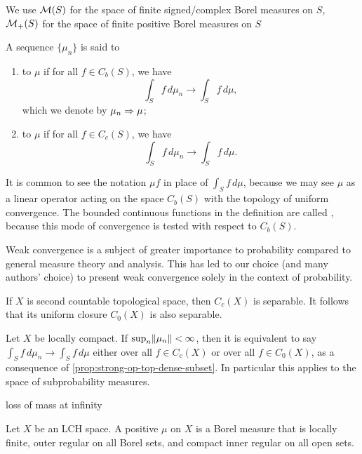 We use $\mathcal{M}(S)$ for the space of finite signed/complex Borel measures on $S$, $\mathcal{M}_+(S)$ for the space of finite positive Borel measures on $S$
\begin{defn}
    A sequence $\{\mu_n\}$ is said to 
    \begin{enumerate}
        \item {} to $\mu$ if for all $f\in C_b(S)$, we have \begin{equation}
        \int_S f\,d\mu_n \to \int_S f\,d\mu, \label{eq:wkconv-def}
    \end{equation}
    which we denote by $\mu_n \Rightarrow \mu$;
    \item {} to $\mu$ if for all $f\in C_c(S)$, we have \begin{equation}
        \int_S f\,d\mu_n \to \int_S f\,d\mu. \label{eq:vgconv-def}
    \end{equation}
    \end{enumerate}
\end{defn}

It is common to see the notation $\mu f$ in place of $\int_S f\,d\mu$, because we may see $\mu$ as a linear operator acting on the space $C_b(S)$ with the topology of uniform convergence. The bounded continuous functions in the definition are called , because this mode of convergence is tested with respect to $C_b(S)$.

Weak convergence is a subject of greater importance to probability compared to general measure theory and analysis. This has led to our choice (and many authors' choice) to present weak convergence solely in the context of probability. %

If $X$ is second countable topological space, then $C_c(X)$ is separable. It follows that its uniform closure $C_0(X)$ is also separable.

Let $X$ be locally compact. If $\sup_n \lVert \mu_n \rVert < \infty$, then it is equivalent to say $\int_S f\,d\mu_n \to \int_S f\,d\mu$ either over all $f \in C_c(X)$ or over all $f \in C_0(X)$, as a consequence of \cref{prop:strong-op-top-dense-subset}. In particular this applies to the space of subprobability measures.


loss of mass at infinity

\begin{defn}
    Let $X$ be an LCH space. A positive  $\mu$ on $X$ is a Borel measure that is locally finite, outer regular on all Borel sets, and compact inner regular on all open sets.
\end{defn}

